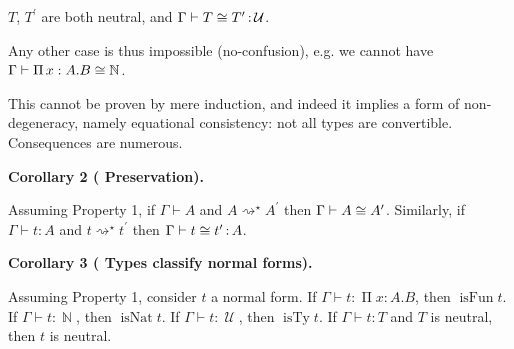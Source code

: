 \documentclass[10pt,a4paper]{amsart}
\begin{document}
$T$, $T^{\prime}$ are both neutral, and $\Gamma\vdash T\mathrel{\raisebox{-0.5pt}{$\cong$}}T^{\prime}\operatorname{%
\mathrel{:}}\operatorname{\mathcal{U}}$.\par
 
 
  
Any other case is thus impossible (no-confusion), e.g. we cannot have $\Gamma\vdash\operatorname{\Pi}x:A.B\mathrel{\raisebox{-0.5pt}{$\cong$}}%
\operatorname{\mathbb{N}}$.\par
 
 
 
 
This cannot be proven by mere induction, and indeed it implies a form of non-degeneracy, namely equational consistency: not all types are convertible. Consequences are numerous.\par
 
 
 
\par\medskip\noindent\textbf{Corollary 2 (  Preservation).}\par
 
 
Assuming Property 1, if $\Gamma\vdash A$ and $A\operatorname{\operatorname{\rightsquigarrow}^{\star}}A^{\prime}$ then $\Gamma\vdash A\mathrel{\raisebox{-0.5pt}{$\cong$}}A^{\prime}$. Similarly, if $\Gamma\vdash t\operatorname{\mathrel{:}}A$ and $t\operatorname{\operatorname{\rightsquigarrow}^{\star}}t^{\prime}$ then $\Gamma\vdash t\mathrel{\raisebox{-0.5pt}{$\cong$}}t^{\prime}\operatorname{%
\mathrel{:}}A$.\par
 
 
 
 
\par\medskip\noindent\textbf{Corollary 3 (  Types classify normal forms).}\par
 
 
Assuming Property 1, consider $t$ a normal form. If $\Gamma\vdash t\operatorname{\mathrel{:}}\operatorname{\Pi}x:A.B$, then $\operatorname{isFun}t$. If $\Gamma\vdash t\operatorname{\mathrel{:}}\operatorname{\mathbb{N}}$, then $\operatorname{isNat}t$. If $\Gamma\vdash t\operatorname{\mathrel{:}}\operatorname{\mathcal{U}}$, then $\operatorname{isTy}t$. If $\Gamma\vdash t\operatorname{\mathrel{:}}T$ and $T$ is neutral, then $t$ is neutral.\par
 
\end{document}
